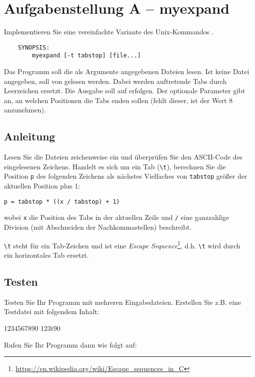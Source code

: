




\section*{Aufgabenstellung A -- myexpand}
Implementieren Sie eine vereinfachte Variante des Unix-Kommandos
.
\begin{verbatim}
    SYNOPSIS:
        myexpand [-t tabstop] [file...]
\end{verbatim}

Das Programm  soll die als Argumente angegebenen Dateien
lesen. Ist keine Datei angegeben, soll von  gelesen werden.
Dabei werden auftretende Tabs durch Leerzeichen ersetzt. Die Ausgabe
soll auf  erfolgen. Der optionale Parameter 
gibt an, an welchen Positionen die Tabs enden sollen (fehlt dieser,
ist der Wert 8 anzunehmen).

\subsection*{Anleitung}
Lesen Sie die Dateien zeichenweise ein und überprüfen Sie den
ASCII-Code des eingelesenen Zeichens. Handelt es sich um ein Tab
(\verb|\t|), berechnen Sie die Position \verb|p| des folgenden
Zeichens als nächstes Vielfaches von \verb|tabstop| größer der
aktuellen Position plus 1:

\verb|p = tabstop * ((x / tabstop) + 1)|

wobei \verb|x| die Position des Tabs in der aktuellen Zeile und
\verb|/| eine ganzzahlige Division (mit Abschneiden der
Nachkommastellen) beschreibt.

\verb|\t| steht für ein Tab-Zeichen und ist eine \emph{Escape
  Sequence}\footnote{\url{https://en.wikipedia.org/wiki/Escape_sequences_in_C}},
d.h. \verb|\t| wird durch ein horizontales Tab ersetzt.

\subsection*{Testen}
Testen Sie Ihr Programm mit mehreren Eingabedateien. Erstellen Sie z.B. eine
Testdatei  mit folgendem Inhalt:

\begin{osuefmtcode}
	1234567890
	123\bslash{}t90
\end{osuefmtcode}

Rufen Sie Ihr Programm dann wie folgt auf:


\osueguidelinesone



